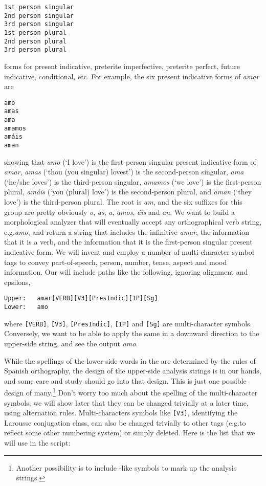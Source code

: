 \begin{Verbatim}
1st person singular
2nd person singular
3rd person singular
1st person plural
2nd person plural
3rd person plural
\end{Verbatim}

\noindent
forms for present indicative, preterite imperfective, preterite perfect,
future indicative, conditional, etc.  For example, the six present indicative
forms of \emph{amar} are


\begin{Verbatim}
amo
amas
ama
amamos
amáis
aman
\end{Verbatim}

\noindent
showing that \emph{amo} (`I love') is the first-person singular present indicative form of
\emph{amar}, \emph{amas} (`thou (you singular) lovest') is the second-person singular,
\emph{ama} (`he/she loves') is the
third-person singular, \emph{amamos} (`we love') is the first-person plural,
\emph{amáis} (`you (plural) love') is the second-person plural, and \emph{aman} (`they
love') is the third-person plural.   The root
is \emph{am}, and the six
suffixes for this group are pretty obviously \emph{o}, \emph{as}, \emph{a}, \emph{amos},
\emph{áis} and \emph{an}.  We want to
build a morphological analyzer that will eventually accept any 
orthographical verb string, e.g.\@ \emph{amo}, and return
a string that includes the infinitive \emph{amar}, the information that it is a
verb, and the information that it is the first-person singular present indicative
form.  
We will invent and employ a number of multi-character symbol tags to
convey part-of-speech, person, number, tense, aspect and mood information.  Our
\fsm{} will include paths like the following, ignoring alignment and epsilons,

\begin{Verbatim}
Upper:   amar[VERB][V3][PresIndic][1P][Sg]
Lower:   amo
\end{Verbatim}

\noindent
where \texttt{[VERB]}, \texttt{[V3]}, \texttt{[PresIndic]}, \texttt{[1P]} and \texttt{[Sg]} are
multi-character symbols.  Conversely, we want to be able to apply the same
\fsm{} in a downward direction to the upper-side string, and see the output
\emph{amo}.

While the spellings of the lower-side words in the
\fsm{} are determined by the rules of Spanish orthography, the design of the upper-side
analysis strings is in our hands, and some care and study should go into that
design.  This is just one possible design of many.\footnote{Another possibility is to include
-like symbols to mark up the analysis strings.}
Don't worry too much about the spelling of the multi-character symbols;
we will show later that they can be changed trivially at a later time, using
alternation rules.
Multi-characters symbols like \texttt{[V3]}, identifying the Larousse conjugation
class, can also be changed trivially to other tags (e.g.\@ to reflect some other
numbering system) or simply deleted.  Here is the list that we
will use in the script:

